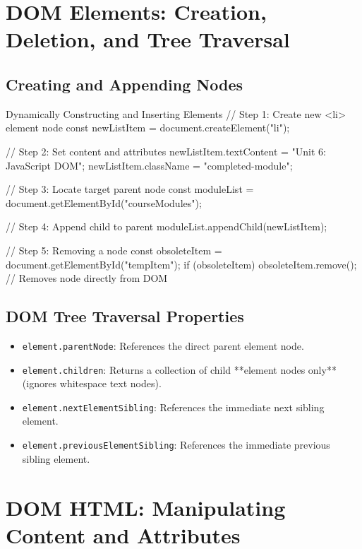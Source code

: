 \section{DOM Elements: Creation, Deletion, and Tree Traversal}

\subsection{Creating and Appending Nodes}
\begin{jscode}{Dynamically Constructing and Inserting Elements}
// Step 1: Create new <li> element node
const newListItem = document.createElement("li");

// Step 2: Set content and attributes
newListItem.textContent = "Unit 6: JavaScript DOM";
newListItem.className = "completed-module";

// Step 3: Locate target parent node
const moduleList = document.getElementById("courseModules");

// Step 4: Append child to parent
moduleList.appendChild(newListItem);

// Step 5: Removing a node
const obsoleteItem = document.getElementById("tempItem");
if (obsoleteItem) {
    obsoleteItem.remove(); // Removes node directly from DOM
}
\end{jscode}

\subsection{DOM Tree Traversal Properties}
\begin{itemize}[leftmargin=1.5em]
    \item \texttt{element.parentNode}: References the direct parent element node.
    \item \texttt{element.children}: Returns a collection of child **element nodes only** (ignores whitespace text nodes).
    \item \texttt{element.nextElementSibling}: References the immediate next sibling element.
    \item \texttt{element.previousElementSibling}: References the immediate previous sibling element.
\end{itemize}

\section{DOM HTML: Manipulating Content and Attributes}

